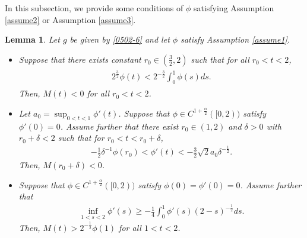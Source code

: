 \documentclass{amsart}
\newtheorem{lemma}[defn]{Lemma}
\numberwithin{equation}{section}
\newcommand {\al}{\alpha}
\newcommand{\de}{\delta}
\begin{document}
 In this subsection, we provide some conditions of $\phi$ satisfying Assumption \ref{assume2} or Assumption \ref{assume3}.
\begin{lemma}\label{prop0320-1}
 Let $g$ be given by \eqref{0502-6} and let $\phi$ satisfy Assumption \ref{assume1}.  
 \begin{itemize}
 \item[(i)]
Suppose that there exists constant $r_0 \in (\frac32,2)$ such that  for all $ r_0 < t < 2$, 
 \begin{align} \label{260323-1}
\begin{split}
   2^\frac32 \phi(t) 
<  2^{-\frac32} \int_0^1   \phi(s)  ds. 
\end{split}
\end{align}
Then, $ M(t) < 0$ for all $ r_0 < t < 2$.

\item[(ii)]
Let $\displaystyle a_0 =\sup_{0 < t< 1} \phi'(t)$. Suppose that $\phi \in C^{1 +\frac{\al}2} ([0, 2 ) )$ satisfy   $\phi'(0)  =0$. Assume further that
there exist  $  r_0 \in (1,2)$ and $\de>0$  with $ r_0 +\de < 2$   such  that for $ r_0  < t < r_0+\de $, 
\begin{align*}%
-\frac12 \de^{-1} \phi(r_0) < \phi'(t) < -\frac{3}2 \sqrt{2} a_0 \de^{-\frac12}.
\end{align*}
Then,  $ M(r_0 +\de) < 0$.

\item[(iii)]
Suppose that $\phi \in C^{1 +\frac{\al}2} ([0, 2 ) )$ satisfy   $\phi(0) = \phi'(0)  =0$. Assume further that
 \begin{align}\label{260320-5}
 \inf_{1 < s<2} \phi'(s) \geq   - \frac14  \int_0^1 \phi'(s) (2 -s)^{-\frac12} ds.
 \end{align}
 Then, $ M(t) >    2^{-\frac12} \phi(1)$ for  all $ 1 < t<2$.
 \end{itemize}
 
\end{lemma}
\end{document}
